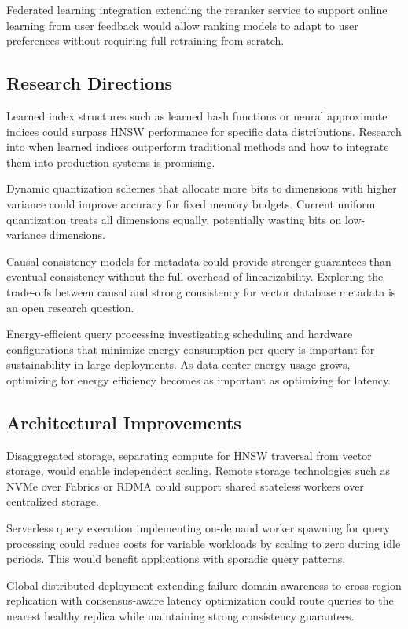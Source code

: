 \documentclass[conference]{IEEEtran}
\begin{document}
Federated learning integration extending the reranker service to support online learning from user feedback would allow ranking models to adapt to user preferences without requiring full retraining from scratch.

\subsection{Research Directions}

Learned index structures such as learned hash functions or neural approximate indices could surpass HNSW performance for specific data distributions. Research into when learned indices outperform traditional methods and how to integrate them into production systems is promising.

Dynamic quantization schemes that allocate more bits to dimensions with higher variance could improve accuracy for fixed memory budgets. Current uniform quantization treats all dimensions equally, potentially wasting bits on low-variance dimensions.

Causal consistency models for metadata could provide stronger guarantees than eventual consistency without the full overhead of linearizability. Exploring the trade-offs between causal and strong consistency for vector database metadata is an open research question.

Energy-efficient query processing investigating scheduling and hardware configurations that minimize energy consumption per query is important for sustainability in large deployments. As data center energy usage grows, optimizing for energy efficiency becomes as important as optimizing for latency.

\subsection{Architectural Improvements}

Disaggregated storage, separating compute for HNSW traversal from vector storage, would enable independent scaling. Remote storage technologies such as NVMe over Fabrics or RDMA could support shared stateless workers over centralized storage.

Serverless query execution implementing on-demand worker spawning for query processing could reduce costs for variable workloads by scaling to zero during idle periods. This would benefit applications with sporadic query patterns.

Global distributed deployment extending failure domain awareness to cross-region replication with consensus-aware latency optimization could route queries to the nearest healthy replica while maintaining strong consistency guarantees.
\end{document}
